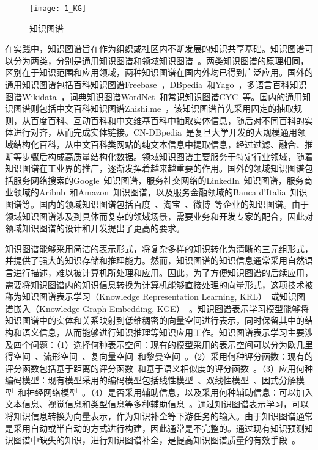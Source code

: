 \documentclass[algorithmlist, AutoFakeBold, AutoFakeSlant, figurelist, tablelist, nomlist, masters]{seuthesix}
\begin{document}
\begin{figure}
  \centering
  \texttt{[image: 1\_KG]}
  \caption{知识图谱}
  \label{1_KG}
\end{figure}

在实践中，知识图谱旨在作为组织或社区内不断发展的知识共享基础。知识图谱可以分为两类，分别是通用知识图谱和领域知识图谱~\cite{hogan2021knowledge}。两类知识图谱的原理相同，区别在于知识范围和应用领域，两种知识图谱在国内外均已得到广泛应用。国外的通用知识图谱包括百科知识图谱Freebase~\cite{bollacker2007platform}，DBpedia~\cite{lehmann2015dbpedia}和Yago~\cite{hoffart2011yago2}，多语言百科知识图谱Wikidata~\cite{vrandevcic2014wikidata}，词典知识图谱WordNet~\cite{miller2007wordnet}和常识知识图谱CYC~\cite{lenat1995cyc}等。国内的通用知识图谱则包括中文百科知识图谱Zhishi.me~\cite{niu2011zhishi}，该知识图谱首先采用固定的抽取规则，从百度百科、互动百科和中文维基百科中抽取实体信息，随后对不同百科的实体进行对齐，从而完成实体链接。CN-DBpedia~\cite{xu2017cn}是复旦大学开发的大规模通用领域结构化百科，从中文百科类网站的纯文本信息中提取信息，经过过滤、融合、推断等步骤后构成高质量结构化数据。领域知识图谱主要服务于特定行业领域，随着知识图谱在工业界的推广，逐渐发挥着越来越重要的作用。国外的领域知识图谱包括服务网络搜索的Google~\cite{singhal_2012}知识图谱，服务社交网络的LinkedIn~\cite{Qi_2016}知识图谱，服务商业领域的Aribnb~\cite{Spencer_2018}和Amazon~\cite{Krishnan_2018}知识图谱，以及服务金融领域的Banca d’Italia~\cite{bellomarini2019knowledge}知识图谱等。国内的领域知识图谱包括百度~\cite{wang2013xlore}、淘宝~\cite{xu2021alime}、微博~\cite{wei2020analysis}等企业的知识图谱。由于领域知识图谱涉及到具体而复杂的领域场景，需要业务和开发专家的配合，因此对领域知识图谱的设计和开发提出了更高的要求。

知识图谱能够采用简洁的表示形式，将复杂多样的知识转化为清晰的三元组形式，并提供了强大的知识存储和推理能力。然而，知识图谱的知识信息通常采用自然语言进行描述，难以被计算机所处理和应用。因此，为了方便知识图谱的后续应用，需要将知识图谱内的知识信息转换为计算机能够直接处理的向量形式，这项技术被称为知识图谱表示学习（Knowledge Representation Learning, KRL）~\cite{chen2022rlpath}或知识图谱嵌入（Knowledge Graph Embedding, KGE）~\cite{wang2021transet}。知识图谱表示学习模型能够将知识图谱中的实体和关系映射到低维稠密的向量空间进行表示，同时保留其中的结构和语义信息，从而能够进行知识推理等知识应用工作。知识图谱表示学习主要涉及四个问题：（1）选择何种表示空间：现有的模型采用的表示空间可以分为欧几里得空间~\cite{lu2022dense}、流形空间~\cite{ebisu2018toruse}、复向量空间~\cite{trouillon2016complex}和黎曼空间~\cite{pan2021hyperbolic}。（2）采用何种评分函数：现有的评分函数包括基于距离的评分函数~\cite{sachan2020knowledge}和基于语义相似度的评分函数~\cite{xiao2017ssp}。（3）应用何种编码模型：现有模型采用的编码模型包括线性模型~\cite{peng2020lineare}、双线性模型~\cite{pan2021hyperbolic}、因式分解模型~\cite{ji2015knowledge}和神经网络模型~\cite{jiang2021kernel}。（4）是否采用辅助信息，以及采用何种辅助信息：可以加入文本信息、视觉信息和类型信息等多种辅助信息~\cite{wang2017knowledge}。通过知识图谱表示学习，可以将知识信息转换为向量表示，作为知识补全等下游任务的输入。由于知识图谱通常是采用自动或半自动的方式进行构建，因此通常是不完整的。通过现有知识预测知识图谱中缺失的知识，进行知识图谱补全，是提高知识图谱质量的有效手段~\cite{vu2019capsule}。
\end{document}

